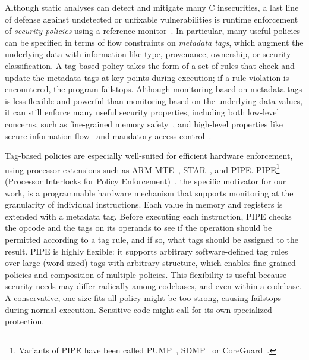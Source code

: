 \documentclass{llncs}
\begin{document}
Although static
analyses can detect and mitigate many C insecurities, a last line of
defense against undetected or unfixable vulnerabilities is runtime
enforcement of {\em security policies} using a reference
monitor~\cite{Anderson72:PlanningStudy}. In particular, 
many useful policies can be specified in terms of flow constraints on 
\emph{metadata tags}, which augment the underlying data with information like type, provenance,
ownership, or security classification. A tag-based policy takes the form of a set of
rules that check and update the metadata tags at key points during execution; if a rule violation is
encountered, the program failstops. 
Although monitoring based on metadata tags is less flexible and powerful than monitoring based on the
underlying data values, it can still enforce many useful security properties, including
both low-level concerns, such as fine-grained memory safety~\cite{Witchel02:MondrianMem}, and high-level
properties like secure information flow~\cite{Denning76:SFIlattice} and mandatory access control~\cite{USDoD85:OrangeBook}. 

Tag-based policies are especially well-suited for efficient hardware enforcement, using 
processor extensions such as ARM MTE~\cite{arm-mte},
STAR~\cite{Gollapudi+23}, and
PIPE.  PIPE\footnote{ Variants of PIPE have
been called PUMP~\cite{Dhawan+14,Dhawan+15},
SDMP~\cite{Dover16,RoesslerD18} or CoreGuard~\cite{Dover20}.} 
(Processor Interlocks for Policy Enforcement)~\cite{Dhawan+15,Azevedo+16,Azevedo+15},
the specific motivator for our work, 
is a programmable hardware mechanism that supports monitoring 
at the granularity of individual instructions. 
Each value in memory and registers
is extended with a metadata tag. Before executing each instruction,
PIPE checks the opcode and the tags on its operands to see if the operation 
should be permitted according to a tag rule, and if so, what tags should be 
assigned to the result.
PIPE is highly flexible: it supports
arbitrary software-defined tag rules over large (word-sized) tags with arbitrary structure,
which enables fine-grained policies and composition of multiple policies. This flexibility 
is useful because security needs may differ radically among codebases,
and even within a codebase. A conservative, one-size-fits-all policy might be too strong,
causing failstops during normal execution. Sensitive code might call for its own specialized
protection.
 
\end{document}
